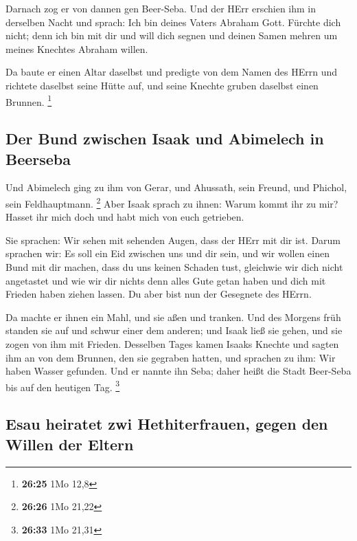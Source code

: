  Darnach zog er von dannen gen Beer-Seba. 
Und der HErr erschien ihm in derselben Nacht und sprach: Ich bin deines
Vaters Abraham Gott. Fürchte dich nicht; denn ich bin mit dir und will
dich segnen und deinen Samen mehren um meines Knechtes Abraham willen.

 Da baute er einen Altar daselbst und predigte von dem
Namen des HErrn und richtete daselbst seine Hütte auf, und seine Knechte
gruben daselbst einen Brunnen. \footnote{\textbf{26:25} 1Mo 12,8}

\hypertarget{der-bund-zwischen-isaak-und-abimelech-in-beerseba}{%
\subsection{Der Bund zwischen Isaak und Abimelech in
Beerseba}\label{der-bund-zwischen-isaak-und-abimelech-in-beerseba}}

 Und Abimelech ging zu ihm von Gerar, und Ahussath, sein
Freund, und Phichol, sein Feldhauptmann. \footnote{\textbf{26:26} 1Mo
  21,22}  Aber Isaak sprach zu ihnen: Warum kommt ihr zu
mir? Hasset ihr mich doch und habt mich von euch getrieben.

 Sie sprachen: Wir sehen mit sehenden Augen, dass der
HErr mit dir ist. Darum sprachen wir: Es soll ein Eid zwischen uns und
dir sein, und wir wollen einen Bund mit dir machen,  dass
du uns keinen Schaden tust, gleichwie wir dich nicht angetastet und wie
wir dir nichts denn alles Gute getan haben und dich mit Frieden haben
ziehen lassen. Du aber bist nun der Gesegnete des HErrn.

 Da machte er ihnen ein Mahl, und sie aßen und tranken.
 Und des Morgens früh standen sie auf und schwur einer
dem anderen; und Isaak ließ sie gehen, und sie zogen von ihm mit
Frieden.  Desselben Tages kamen Isaaks Knechte und sagten
ihm an von dem Brunnen, den sie gegraben hatten, und sprachen zu ihm:
Wir haben Wasser gefunden.  Und er nannte ihn Seba; daher
heißt die Stadt Beer-Seba bis auf den heutigen Tag. \footnote{\textbf{26:33}
  1Mo 21,31}

\hypertarget{esau-heiratet-zwi-hethiterfrauen-gegen-den-willen-der-eltern}{%
\subsection{Esau heiratet zwi Hethiterfrauen, gegen den Willen der
Eltern}\label{esau-heiratet-zwi-hethiterfrauen-gegen-den-willen-der-eltern}}

